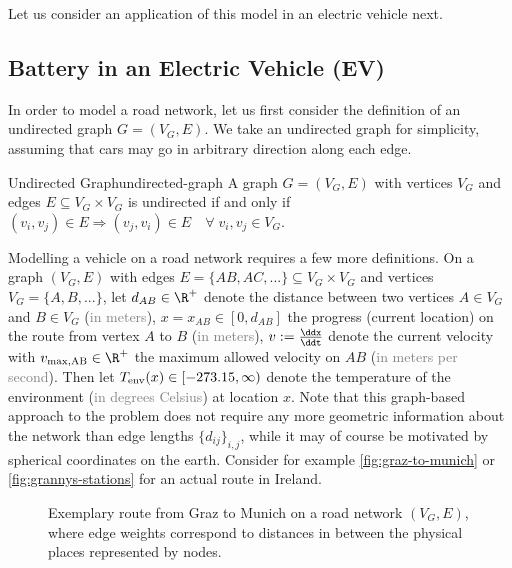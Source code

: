 \documentclass{prettytex/ox/mmsc-special-topic}
\begin{document}
  Let us consider an application of this model in an electric vehicle next.

  \subsection{Battery in an Electric Vehicle (EV)}
  In order to model a road network, let us first consider the definition of an undirected graph $G = (V_G, E)$. We take an undirected graph for simplicity, assuming that cars may go in arbitrary direction along each edge.
  \begin{definition}{Undirected Graph}{undirected-graph}
    A graph $G = (V_G, E)$ with vertices $V_G$ and edges $E \subseteq V_G \times V_G$ is undirected if and only if $(v_i, v_j) \in E \Rightarrow (v_j, v_i) \in E \quad \forall\; v_i, v_j \in V_G$.
  \end{definition}

  Modelling a vehicle on a road network requires a few more definitions.
  On a graph $(V_G, E)$ with edges $E = \{AB, AC, ...\} \subseteq V_G \times V_G$ and vertices $V_G = \{A, B, ...\}$, let
  $d_{AB} \in \R^+$ denote the distance between two vertices $A \in V_G$ and $B \in V_G$ (\textcolor{gray}{in meters}),
  $x = x_{AB} \in [0, d_{AB}]$ the progress (current location) on the route from vertex $A$ to $B$ (\textcolor{gray}{in meters}),
  $v := \frac{\ddx}{\ddt}$ denote the current velocity with
  $v_{\rm max, AB} \in \R^+$ the maximum allowed velocity on $AB$ (\textcolor{gray}{in meters per second}).
  Then let
  $T_{\rm env}(x) \in [-273.15, \infty)$ denote the temperature of the environment (\textcolor{gray}{in degrees Celsius}) at location $x$.
  Note that this graph-based approach to the problem does not require any more geometric information about the network than edge lengths $\{d_{ij}\}_{i,j}$, while it may of course be motivated by spherical coordinates on the earth.
  Consider for example \autoref{fig:graz-to-munich} or \autoref{fig:grannys-stations} for an actual route in Ireland.

  \begin{figure}[H]
    \centering
    \caption{Exemplary route from Graz to Munich on a road network $(V_G, E)$, where edge weights correspond to distances in between the physical places represented by nodes.}
    \label{fig:graz-to-munich}
  \end{figure}
\end{document}
